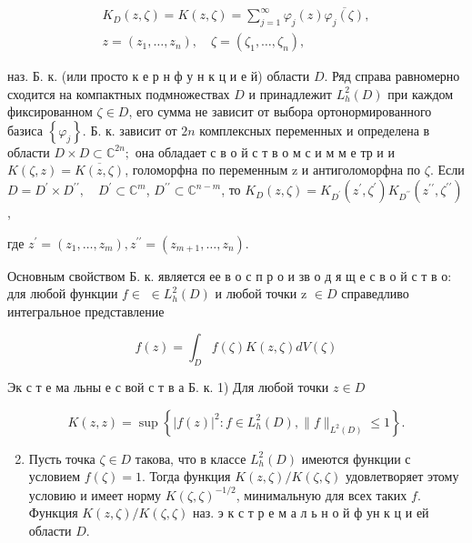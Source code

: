 \documentclass[10pt]{article}
\begin{document}
\[

\begin{gathered}

K_{D}(z, \zeta)=K(z, \zeta)=\sum_{j=1}^{\infty} \varphi_{j}(z) \overline{\varphi_{j}(\zeta)}, \\

z=\left(z_{1}, \ldots, z_{n}\right), \quad \zeta=\left(\zeta_{1}, \ldots, \zeta_{n}\right),

\end{gathered}

\]



наз. Б. к. (или просто к е р н ф у н к ц и е й) области $D$. Ряд справа равномерно сходится на компактных подмножествах $D$ и принадлежит $L_{h}^{2}(D)$ при каждом фиксированном $\zeta \in D$, его сумма не зависит от выбора ортонормированного базиса $\left\{\varphi_{j}\right\}$. Б. к. зависит от $2 n$ комплексных переменных и определена в области $D \times D \subset \mathbb{C}^{2 n} ;$ она обладает с в о й с т в о м с и м м е тр и и $K(\zeta, z)=\overline{K(z, \zeta)}$, голоморфна по переменным z и антиголоморфна по $\zeta$. Если $D=D^{\prime} \times D^{\prime \prime}, \quad D^{\prime} \subset \mathbb{C}^{m}$, $D^{\prime \prime} \subset \mathbb{C}^{n-m}$, то $K_{D}(z, \zeta)=K_{D^{\prime}}\left(z^{\prime}, \zeta^{\prime}\right) K_{D^{\prime \prime}}\left(z^{\prime \prime}, \zeta^{\prime \prime}\right)$,



где $z^{\prime}=\left(z_{1}, \ldots, z_{m}\right), z^{\prime \prime}=\left(z_{m+1}, \ldots, z_{n}\right)$.



Основным свойством Б. к. является ее в о с п р о и зв о д я щ е с в о й с т в о: для любой функции $f \in$ $\in L_{h}^{2}(D)$ и любой точки z $\in D$ справедливо интегральное представление



\[

f(z)=\int_{D} f(\zeta) K(z, \zeta) d V(\zeta)

\]



Эк с т е ма льны е с вой с т в а Б. к. 1) Для любой точки $z \in D$



\[

K(z, z)=\sup \left\{|f(z)|^{2}: f \in L_{h}^{2}(D),\|f\|_{L^{2}(D)} \leqslant 1\right\} .

\]



\begin{enumerate}

  \setcounter{enumi}{1}

  \item Пусть точка $\zeta \in D$ такова, что в классе $L_{h}^{2}(D)$ имеются функции с условием $f(\zeta)=1$. Тогда функция $K(z, \zeta) / K(\zeta, \zeta)$ удовлетворяет этому условию и имеет норму $K(\zeta, \zeta)^{-1 / 2}$, минимальную для всех таких $f$. Функция $K(z, \zeta) / K(\zeta, \zeta)$ наз. э к с т р е м а л ь н о й ф ун к ц и ей области $D$.

\end{enumerate}
\end{document}
